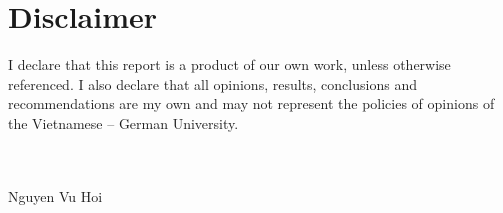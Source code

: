 \documentclass[pdftex,12pt,a4paper]{article}
\begin{document}
  
  
  
  \newpage
  \tableofcontents
  \newpage
  \listoffigures
  
  \setlength{\parindent}{0em}
  \setlength{\parskip}{1em}
  
  \newpage
  \section*{Disclaimer}
  I declare that this report is a product of our own work, unless otherwise referenced. I also declare that all opinions, results, conclusions and recommendations are my own and may not represent the policies of opinions of the Vietnamese – German University.\\ \\ \\
  \begin{flushright}
  \textup{Nguyen Vu Hoi}
  \end{flushright}
  
  \newpage
\end{document}
